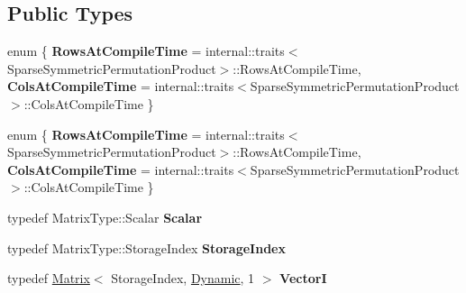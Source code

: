 \subsection*{Public Types}
\begin{DoxyCompactItemize}
\item 
\mbox{\label{class_eigen_1_1_sparse_symmetric_permutation_product_aee8e231304a468ee5a4a64adf1c3be03}} 
enum \{ {\bfseries Rows\+At\+Compile\+Time} = internal\+:\+:traits$<$Sparse\+Symmetric\+Permutation\+Product$>$\+:\+:Rows\+At\+Compile\+Time, 
{\bfseries Cols\+At\+Compile\+Time} = internal\+:\+:traits$<$Sparse\+Symmetric\+Permutation\+Product$>$\+:\+:Cols\+At\+Compile\+Time
 \}
\item 
\mbox{\label{class_eigen_1_1_sparse_symmetric_permutation_product_ae94697e83b4bb30596a946cd32f40c92}} 
enum \{ {\bfseries Rows\+At\+Compile\+Time} = internal\+:\+:traits$<$Sparse\+Symmetric\+Permutation\+Product$>$\+:\+:Rows\+At\+Compile\+Time, 
{\bfseries Cols\+At\+Compile\+Time} = internal\+:\+:traits$<$Sparse\+Symmetric\+Permutation\+Product$>$\+:\+:Cols\+At\+Compile\+Time
 \}
\item 
\mbox{\label{class_eigen_1_1_sparse_symmetric_permutation_product_a3c747f700e8423db88fef150c2a282ec}} 
typedef Matrix\+Type\+::\+Scalar {\bfseries Scalar}
\item 
\mbox{\label{class_eigen_1_1_sparse_symmetric_permutation_product_a1d2ee3395263f4c835ee4296368ac731}} 
typedef Matrix\+Type\+::\+Storage\+Index {\bfseries Storage\+Index}
\item 
\mbox{\label{class_eigen_1_1_sparse_symmetric_permutation_product_a1d2d670e84b37851b9568ceae8f981ed}} 
typedef \hyperlink{group___core___module_class_eigen_1_1_matrix}{Matrix}$<$ Storage\+Index, \hyperlink{namespace_eigen_ad81fa7195215a0ce30017dfac309f0b2}{Dynamic}, 1 $>$ {\bfseries VectorI}
\item 
\mbox{\label{class_eigen_1_1_sparse_symmetric_permutation_product_a099934ac338e7299e4e61e4ddedf42e8}} 

\end{DoxyCompactItemize}
